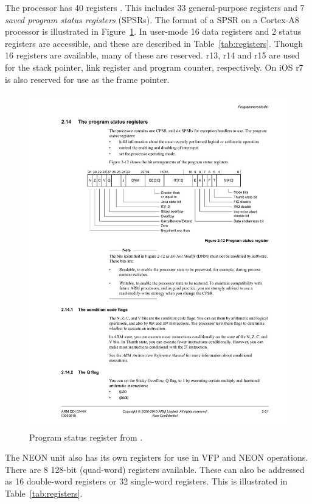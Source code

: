 \documentclass[oneside,a4paper]{report}
\begin{document}
The processor has 40 registers \cite[p. 2-18]{A8Ref}. This includes 33 general-purpose registers and 7 \emph{saved program status registers} (SPSRs). The format of a SPSR on a Cortex-A8 processor is illustrated in Figure~\ref{fig:cpsr}. In user-mode 16 data registers and 2 status registers are accessible, and these are described in Table~\ref{tab:registers}. Though 16 registers are available, many of these are reserved. r13, r14 and r15 are used for the stack pointer, link register and program counter, respectively. On iOS r7 is also reserved for use as the frame pointer.

\begin{figure}[htb]
	\centering
	\includegraphics[width=1.0\textwidth]{./fig/CPSR.pdf}
	\caption{Program status register from \cite[p. 2-21]{A8Ref}.}
	\label{fig:cpsr}
\end{figure}

The NEON unit also has its own registers for use in VFP and NEON operations. There are 8 128-bit (quad-word) registers available. These can also be addressed as 16 double-word registers or 32 single-word registers. This is illustrated in Table~\ref{tab:registers}.
\end{document}
